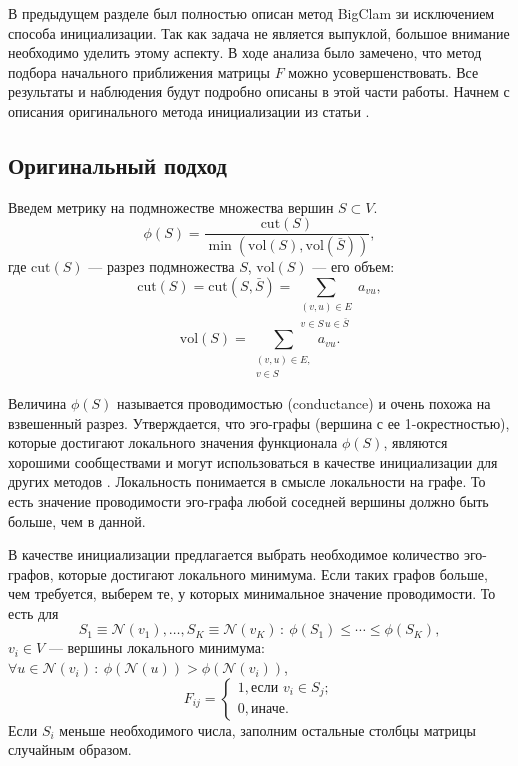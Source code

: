 \documentclass{ITaSconf}
\begin{document}
В предыдущем разделе был полностью описан метод BigClam зи исключением способа инициализации. 
Так как задача не является выпуклой, большое внимание необходимо уделить этому аспекту. 
В ходе анализа было замечено, что метод подбора начального приближения матрицы $F$ можно усовершенствовать. 
Все результаты и наблюдения будут подробно описаны в этой части работы. 
Начнем с описания оригинального метода инициализации из статьи \cite{gleich2011neighborhoods}. 

\subsection{Оригинальный подход}

Введем метрику на подмножестве множества вершин $ S \subset V $.
$$\phi(S) = \dfrac{\mathrm{cut}(S)}{\min(\mathrm{vol}(S), \mathrm{vol}( \bar S))},$$
где $\mathrm{cut}(S)$ --- разрез подмножества $S$, $\mathrm{vol}(S)$ --- его объем:
$$\mathrm{cut}(S) = \mathrm{cut}(S, \bar S)=\sum_{\substack{(v,u)\in E\\ v \in S \, u \in \bar S}} a_{vu},$$
$$\mathrm{vol}(S) =\sum_{\substack{(v,u)\in E,\\ v \in S}} a_{vu}.$$

Величина $\phi(S)$ называется проводимостью (conductance) и очень похожа на взвешенный разрез.
Утверждается, что эго-графы (вершина с ее 1-окрестностью), которые достигают локального значения функционала $\phi(S)$,  являются хорошими сообществами и могут использоваться в качестве инициализации для других методов \cite{gleich2011neighborhoods}.
Локальность понимается в смысле локальности на графе. 
То есть значение проводимости эго-графа любой соседней вершины должно быть больше, чем в данной. 

В качестве инициализации предлагается выбрать необходимое количество эго-графов, которые достигают локального минимума. Если таких графов больше, чем требуется, выберем те, у которых минимальное значение проводимости.
То есть для 
$$S_1 \equiv \mathcal{N}(v_1), \dots, S_K \equiv \mathcal{N}(v_K)\,:\:\phi(S_1) \le \cdots \le \phi(S_K),$$
$v_i \in V$ --- вершины локального минимума: $\forall u \in \mathcal{N}(v_i) \, : \: \phi(\mathcal{N}(u)) > \phi(\mathcal{N}(v_i))$,
$$ 
F_{ij}=	
\begin{cases} 	1,  \text{если } v_i \in S_j;\\
0,  \text{иначе. } 
\end{cases}
$$
Если $S_i$ меньше необходимого числа, заполним остальные столбцы матрицы случайным образом.
\end{document}
